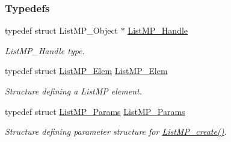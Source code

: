 \subsubsection*{Typedefs}
\begin{DoxyCompactItemize}
\item 
typedef struct ListMP\_\-Object $\ast$ \hyperlink{_list_m_p_8h_abf5a0381ce9dab133382015abaf7fe6b}{ListMP\_\-Handle}
\begin{DoxyCompactList}\small\item\em ListMP\_\-Handle type. \item\end{DoxyCompactList}\item 
typedef struct \hyperlink{struct_list_m_p___elem}{ListMP\_\-Elem} \hyperlink{_list_m_p_8h_a848cf7dfe687e86045808fca1c561ea0}{ListMP\_\-Elem}
\begin{DoxyCompactList}\small\item\em Structure defining a ListMP element. \item\end{DoxyCompactList}\item 
typedef struct \hyperlink{struct_list_m_p___params}{ListMP\_\-Params} \hyperlink{_list_m_p_8h_ad2f3144c55c1f05df600bc6f37290b8f}{ListMP\_\-Params}
\begin{DoxyCompactList}\small\item\em Structure defining parameter structure for \hyperlink{_list_m_p_8h_a71fdd7f30d377065fb70dd095a186d3e}{ListMP\_\-create()}. \item\end{DoxyCompactList}\end{DoxyCompactItemize}
